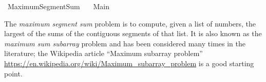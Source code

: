 %
\begin{isabellebody}%
%
%
\isadelimdocument
%
\endisadelimdocument
%
\isatagdocument
%
\isamarkuptrue%
%
\endisatagdocument
{\isafolddocument}%
%
\isadelimdocument
%
\endisadelimdocument
%
\isadelimtheory
%
\endisadelimtheory
%
\isatagtheory
{}\isamarkupfalse%
\ Maximum{\isacharunderscore}{\kern0pt}Segment{\isacharunderscore}{\kern0pt}Sum\isanewline
\ \ \ Main\isanewline
{}%
\endisatagtheory
{\isafoldtheory}%
%
\isadelimtheory
%
\endisadelimtheory
%
\begin{isamarkuptext}%
The \emph{maximum segment sum} problem is to compute, given a list of numbers,
the largest of the sums of the contiguous segments of that list. It is also known
as the \emph{maximum sum subarray} problem and has been considered many times in the literature;
the Wikipedia article ``Maximum subarray problem''
\url{https://en.wikipedia.org/wiki/Maximum_subarray_problem} is a good starting point.


\end{isamarkuptext}
\end{isabellebody}
